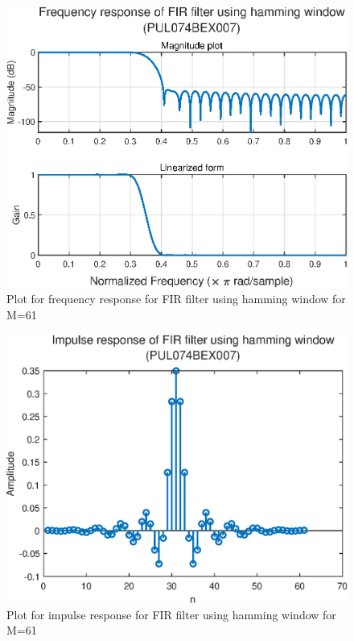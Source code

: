 \documentclass{lab_sheet}
\begin{document}
\begin{figure}[H]
    \centering
    \includegraphics[width=0.65\linewidth]{../Figures/hamming-fir.eps}
    \caption{Plot for frequency response for FIR filter using hamming window for M=61}
    \label{fig:hamming-fir}
\end{figure}

\begin{figure}[H]
    \centering
    \includegraphics[width=0.65\linewidth]{../Figures/hamming-imp.eps}
    \caption{Plot for impulse response for FIR filter using hamming window for M=61}
    \label{fig:hamming-imp}
\end{figure}
\end{document}
